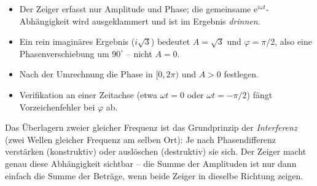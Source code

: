 \begin{achtung}
\begin{itemize}
  \item Der Zeiger erfasst nur Amplitude und Phase; die gemeinsame
        $\mathrm e^{i\omega t}$-Abhängigkeit wird ausgeklammert und ist im
        Ergebnis \emph{drinnen}.
  \item Ein rein imaginäres Ergebnis ($i\sqrt3$) bedeutet $A=\sqrt3$ und
        $\varphi=\pi/2$, also eine Phasenverschiebung um
        $90^\circ$ -- nicht $A=0$.
  \item Nach der Umrechnung die Phase in $[0,2\pi)$ und $A>0$ festlegen.
  \item Verifikation an einer Zeitachse (etwa $\omega t=0$ oder
        $\omega t=-\pi/2$) fängt Vorzeichenfehler bei $\varphi$ ab.
\end{itemize}
\end{achtung}

\begin{werkzeugkasten}
Das Überlagern zweier gleicher Frequenz ist das Grundprinzip der
\emph{Interferenz} (zwei Wellen gleicher Frequenz am selben Ort): Je nach
Phasendifferenz verstärken (konstruktiv) oder auslöschen (destruktiv) sie
sich. Der Zeiger macht genau diese Abhängigkeit sichtbar -- die Summe
der Amplituden ist nur dann einfach die Summe der Beträge, wenn beide
Zeiger in dieselbe Richtung zeigen.
\end{werkzeugkasten}
